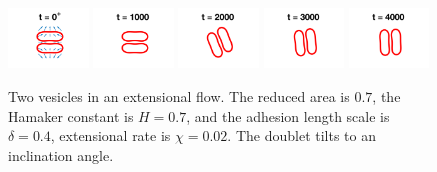 \documentclass[prf,superscriptaddress,showpacs]{revtex4-1}
\begin{document}
\begin{figure}[htp]
  \includegraphics[width = 0.19\textwidth]{figs/extensional_adR4em1adS7em1Chi2em2_ra070_image01.png}
  \includegraphics[width = 0.19\textwidth]{figs/extensional_adR4em1adS7em1Chi2em2_ra070_image02.png}
  \includegraphics[width = 0.19\textwidth]{figs/extensional_adR4em1adS7em1Chi2em2_ra070_image03.png}
  \includegraphics[width = 0.19\textwidth]{figs/extensional_adR4em1adS7em1Chi2em2_ra070_image04.png}
  \includegraphics[width = 0.19\textwidth]{figs/extensional_adR4em1adS7em1Chi2em2_ra070_image05.png}
  \caption{\label{fig:extensional1} Two vesicles in an extensional flow.
  The reduced area is $0.7$, the Hamaker constant is $H = 0.7$, and the
  adhesion length scale is $\delta = 0.4$, extensional rate is $\chi =
  0.02$.  The doublet tilts to an inclination angle.
  }
\end{figure}
\end{document}
